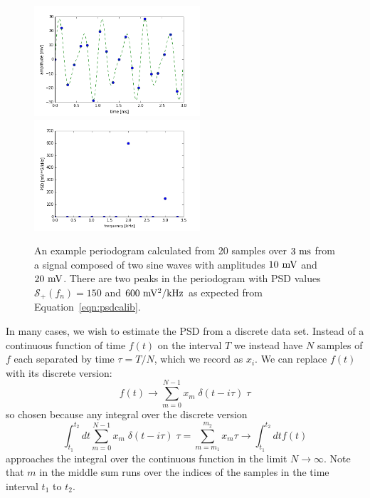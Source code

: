\documentclass[12pt]{article}
\begin{document}
\begin{figure}[thb]
\begin{center}
{\includegraphics[width=0.55\textwidth]{figs/periodogram_ts.png}}\\
{\includegraphics[width=0.55\textwidth]{figs/periodogram_eg.png}}
\end{center}
\caption{\label{fig:periodogram}  An example periodogram calculated from 20 samples over $3~\rm ms$ from a signal composed of two sine waves with amplitudes $10~\rm mV$ and $20~\rm mV$.  There are two peaks in the periodogram with PSD values $\mathcal{S}_{+}(f_n) = 150$ and $600~{\rm mV^2} / {\rm kHz}$ as expected from Equation~\ref{eqn:psdcalib}.
}
\end{figure}

In many cases, we wish to estimate the PSD from a discrete data set.  Instead of a continuous function of time $f(t)$ on the interval $T$ we instead have $N$ samples of $f$ each separated by time $\tau = T/N$, which we record as $x_i$.  We can replace $f(t)$ with its discrete version:
\begin{equation}
f(t) \to \sum_{m=0}^{N-1} x_m \; \delta(t - i\tau) \; \tau \label{eqn:discretef}
\end{equation}
so chosen because any integral over the discrete version
\begin{displaymath}
\int_{t_1}^{t_2} dt \sum_{m=0}^{N-1} x_m \; \delta(t - i\tau) \; \tau = \sum_{m=m_1}^{m_2} x_m  \tau
\to \int_{t_1}^{t_2} dt f(t)  
\end{displaymath}
approaches the integral over the continuous function in the limit $N \to \infty$.  Note that $m$ in the middle sum runs over the indices of the samples in the time interval $t_1$ to $t_2$.
\end{document}
